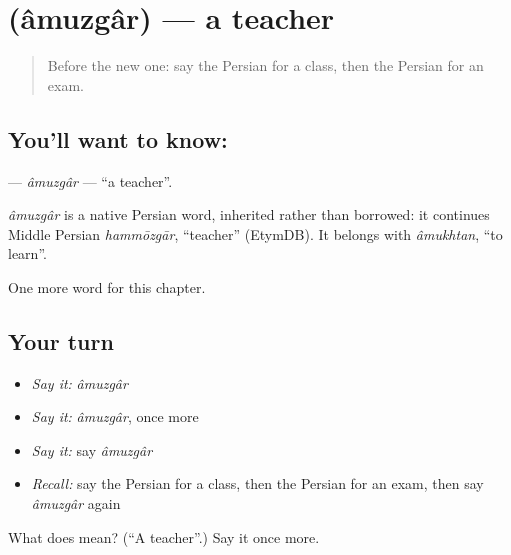 \section[\texorpdfstring{\fa{آموزگار} (âmuzgâr)}{آموزگار (âmuzgâr)}]{ (âmuzgâr) — a teacher}

\label{lesson:FA-C114-amuzgar}



\begin{quote}
Before the new one: say the Persian for a class, then the Persian for an exam.
\end{quote}

\subsection*{You'll want to know: }
\textbf{} — \emph{âmuzgâr} — \textquotedblleft{}a teacher\textquotedblright{}.

\begin{cousinweb}
\emph{âmuzgâr} is a native Persian word, inherited rather than borrowed: it continues Middle Persian \emph{hammōzgār}, \textquotedblleft{}teacher\textquotedblright{} (EtymDB). It belongs with \emph{âmukhtan}, \textquotedblleft{}to learn\textquotedblright{}.
\end{cousinweb}

\begin{grammarlens}[title={What you've built}]
One more word for this chapter.
\end{grammarlens}

\subsection*{Your turn}
\begin{itemize}
\raggedright
  \item \emph{Say it:} \emph{âmuzgâr}
  \item \emph{Say it:} \emph{âmuzgâr}, once more
  \item \emph{Say it:} say \emph{âmuzgâr}
  \item \emph{Recall:} say the Persian for a class, then the Persian for an exam, then say \emph{âmuzgâr} again
\end{itemize}

\begin{tcolorbox}[breakable,colback=teal!4,colframe=teal!35!black,title={Before you move on}]
What does  mean? (\textquotedblleft{}A teacher\textquotedblright{}.) Say it once more.
\end{tcolorbox}

